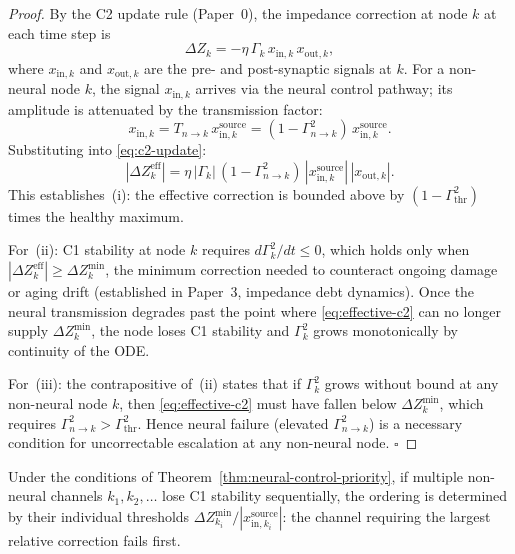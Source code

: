 \documentclass[aps,pre,twocolumn,superscriptaddress,floatfix]{revtex4-2}
\begin{document}
\begin{proof}
By the C2 update rule (Paper~0), the impedance
correction at node $k$ at each time step is
\begin{equation}
  \Delta Z_k = -\eta\,\Gamma_k\,x_{\mathrm{in},k}\,x_{\mathrm{out},k},
  \label{eq:c2-update}
\end{equation}
where $x_{\mathrm{in},k}$ and $x_{\mathrm{out},k}$ are
the pre- and post-synaptic signals at $k$.
For a non-neural node $k$, the signal $x_{\mathrm{in},k}$
arrives via the neural control pathway;
its amplitude is attenuated by the transmission factor:
\begin{equation}
  x_{\mathrm{in},k} =
  T_{n \to k}\,x_{\mathrm{in},k}^{\mathrm{source}}
  = (1 - \Gamma_{n \to k}^2)\,x_{\mathrm{in},k}^{\mathrm{source}}.
  \label{eq:signal-attenuation}
\end{equation}
Substituting into \eqref{eq:c2-update}:
\begin{equation}
  |\Delta Z_k^{\mathrm{eff}}|
  = \eta\,|\Gamma_k|\,
    (1 - \Gamma_{n \to k}^2)\,|x_{\mathrm{in},k}^{\mathrm{source}}|\,
    |x_{\mathrm{out},k}|.
  \label{eq:effective-c2}
\end{equation}
This establishes~(i): the effective correction is
bounded above by $(1 - \Gamma_{\mathrm{thr}}^2)$ times
the healthy maximum.

For~(ii): C1 stability at node $k$ requires
$d\Gamma_k^2/dt \leq 0$, which holds only when
$|\Delta Z_k^{\mathrm{eff}}| \geq \Delta Z_k^{\mathrm{min}}$,
the minimum correction needed to counteract ongoing
damage or aging drift (established in Paper~3,
impedance debt dynamics).
Once the neural transmission degrades past the point
where \eqref{eq:effective-c2} can no longer supply
$\Delta Z_k^{\mathrm{min}}$, the node loses C1
stability and $\Gamma_k^2$ grows monotonically by
continuity of the ODE.

For~(iii): the contrapositive of~(ii) states that if
$\Gamma_k^2$ grows without bound at any non-neural
node $k$, then \eqref{eq:effective-c2} must have
fallen below $\Delta Z_k^{\mathrm{min}}$, which
requires $\Gamma_{n \to k}^2 > \Gamma_{\mathrm{thr}}^2$.
Hence neural failure (elevated $\Gamma_{n \to k}^2$)
is a necessary condition for uncorrectable escalation
at any non-neural node. $\square$
\end{proof}

\begin{corollary}
\label{cor:cascade-ordering}
Under the conditions of Theorem~\ref{thm:neural-control-priority},
if multiple non-neural channels $k_1, k_2, \ldots$ lose
C1 stability sequentially, the ordering is determined
by their individual thresholds
$\Delta Z_{k_i}^{\mathrm{min}} / |x_{\mathrm{in},k_i}^{\mathrm{source}}|$:
the channel requiring the largest relative correction
fails first.
\end{corollary}
\end{document}
